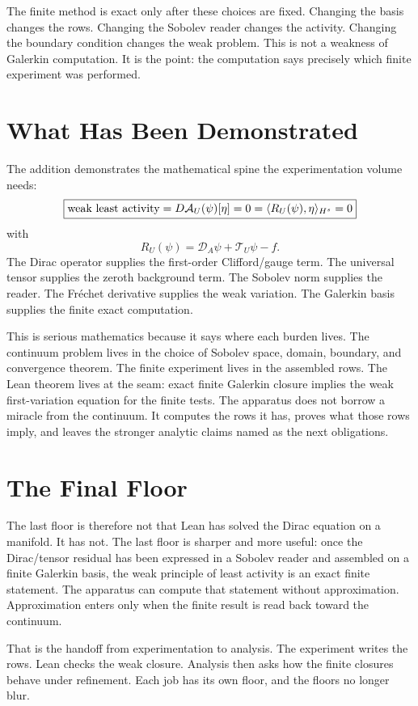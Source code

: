 The finite method is exact only after these choices are fixed. Changing the basis changes the rows. Changing the
Sobolev reader changes the activity. Changing the boundary condition changes the weak problem. This is not a
weakness of Galerkin computation. It is the point: the computation says precisely which finite experiment was
performed.

\section{What Has Been Demonstrated}

The addition demonstrates the mathematical spine the experimentation volume needs:
\[
  \boxed{
  \hbox{weak least activity}
  =
  D\mathcal A_U(\psi)[\eta]=0
  =
  \langle R_U(\psi),\eta\rangle_{H^s}=0
  }
\]
with
\[
  R_U(\psi)=\mathcal D_A\psi+\mathcal T_U\psi-f .
\]
The Dirac operator supplies the first-order Clifford/gauge term. The universal tensor supplies the zeroth
background term. The Sobolev norm supplies the reader. The Fréchet derivative supplies the weak variation. The
Galerkin basis supplies the finite exact computation.

This is serious mathematics because it says where each burden lives. The continuum problem lives in the choice
of Sobolev space, domain, boundary, and convergence theorem. The finite experiment lives in the assembled rows.
The Lean theorem lives at the seam: exact finite Galerkin closure implies the weak first-variation equation for
the finite tests. The apparatus does not borrow a miracle from the continuum. It computes the rows it has, proves
what those rows imply, and leaves the stronger analytic claims named as the next obligations.

\section{The Final Floor}

The last floor is therefore not that Lean has solved the Dirac equation on a manifold. It has not. The last floor
is sharper and more useful: once the Dirac/tensor residual has been expressed in a Sobolev reader and assembled
on a finite Galerkin basis, the weak principle of least activity is an exact finite statement. The apparatus can
compute that statement without approximation. Approximation enters only when the finite result is read back
toward the continuum.

That is the handoff from experimentation to analysis. The experiment writes the rows. Lean checks the weak
closure. Analysis then asks how the finite closures behave under refinement. Each job has its own floor, and the
floors no longer blur.
